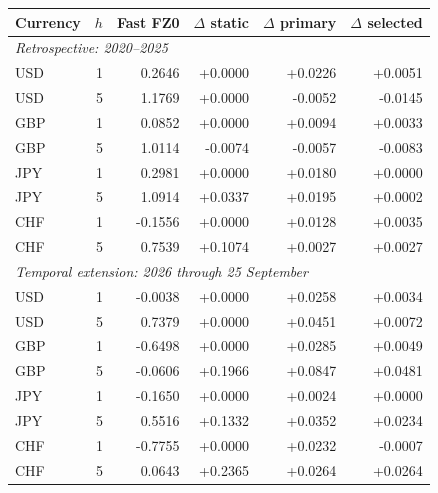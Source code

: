 \begin{tabular}{@{}lrrrrr@{}}\toprule
Currency & $h$ & Fast FZ0 & $\Delta$ static & $\Delta$ primary & $\Delta$ selected\\\midrule
\multicolumn{6}{l}{\textit{Retrospective: 2020--2025}}\\
USD & 1 & 0.2646 & +0.0000 & +0.0226 & +0.0051\\
USD & 5 & 1.1769 & +0.0000 & -0.0052 & -0.0145\\
GBP & 1 & 0.0852 & +0.0000 & +0.0094 & +0.0033\\
GBP & 5 & 1.0114 & -0.0074 & -0.0057 & -0.0083\\
JPY & 1 & 0.2981 & +0.0000 & +0.0180 & +0.0000\\
JPY & 5 & 1.0914 & +0.0337 & +0.0195 & +0.0002\\
CHF & 1 & -0.1556 & +0.0000 & +0.0128 & +0.0035\\
CHF & 5 & 0.7539 & +0.1074 & +0.0027 & +0.0027\\
\midrule
\multicolumn{6}{l}{\textit{Temporal extension: 2026 through 25 September}}\\
USD & 1 & -0.0038 & +0.0000 & +0.0258 & +0.0034\\
USD & 5 & 0.7379 & +0.0000 & +0.0451 & +0.0072\\
GBP & 1 & -0.6498 & +0.0000 & +0.0285 & +0.0049\\
GBP & 5 & -0.0606 & +0.1966 & +0.0847 & +0.0481\\
JPY & 1 & -0.1650 & +0.0000 & +0.0024 & +0.0000\\
JPY & 5 & 0.5516 & +0.1332 & +0.0352 & +0.0234\\
CHF & 1 & -0.7755 & +0.0000 & +0.0232 & -0.0007\\
CHF & 5 & 0.0643 & +0.2365 & +0.0264 & +0.0264\\
\bottomrule\end{tabular}
